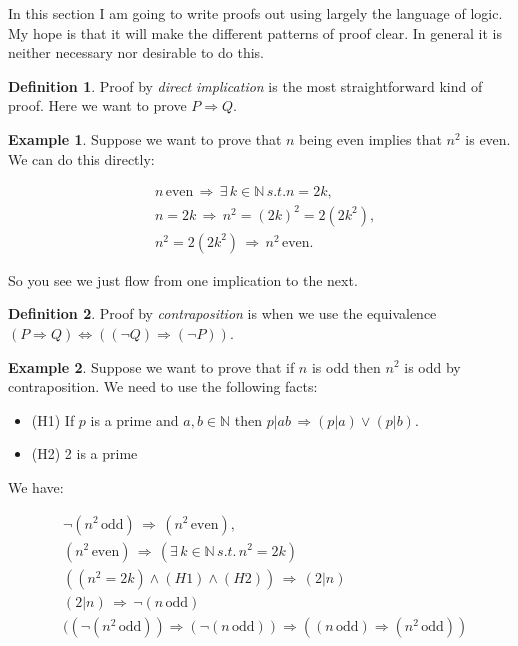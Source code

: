 \documentclass[
]{book}
\theoremstyle{definition}
\newtheorem{definition}{Definition}[chapter]
\theoremstyle{definition}
\newtheorem{example}{Example}[chapter]
\theoremstyle{definition}
\theoremstyle{definition}
\theoremstyle{remark}
\begin{document}
In this section I am going to write proofs out using largely the language of logic. My hope is that it will make the different patterns of proof clear. In general it is neither necessary nor desirable to do this.

\begin{definition}
Proof by \emph{direct implication} is the most straightforward kind of proof. Here we want to prove \(P \Rightarrow Q\).
\end{definition}

\begin{example}
Suppose we want to prove that \(n\) being even implies that \(n^2\) is even. We can do this directly:

\begin{align*}
 & n \, \mbox{even} \, \Rightarrow \, \exists \, k \in \mathbb{N} \, s.t. n=2k, \\
 & n = 2k \, \Rightarrow \, n^2 = (2k)^2 = 2 (2k^2), \\
 & n^2 = 2(2k^2) \, \Rightarrow \, n^2 \, \mbox{even}.
\end{align*}

So you see we just flow from one implication to the next.
\end{example}

\begin{definition}
Proof by \emph{contraposition} is when we use the equivalence \((P\Rightarrow Q) \Leftrightarrow ((\neg Q) \Rightarrow (\neg P))\).
\end{definition}

\begin{example}
Suppose we want to prove that if \(n\) is odd then \(n^2\) is odd by contraposition. We need to use the following facts:

\begin{itemize}
\item
  (H1) If \(p\) is a prime and \(a,b \in \mathbb{N}\) then \(p|ab \, \Rightarrow (p|a)\vee(p|b)\).
\item
  (H2) 2 is a prime
\end{itemize}

We have:

\begin{align*}
& \neg (n^2 \, \mbox{odd}) \, \Rightarrow \, (n^2 \, \mbox{even}), \\
& (n^2 \, \mbox{even}) \, \Rightarrow \, (\exists \, k \in \mathbb{N} \, s.t. \, n^2=2k) \\
& ((n^2=2k)\wedge(H1)\wedge(H2))\, \Rightarrow \,(2|n)\\
& (2|n)\, \Rightarrow \, \neg(n \, \mbox{odd})\\
& ((\neg(n^2 \, \mbox{odd})) \Rightarrow (\neg(n \, \mbox{odd})) \Rightarrow ((n \, \mbox{odd})\Rightarrow (n^2 \, \mbox{odd}))
\end{align*}
\end{example}
\end{document}
